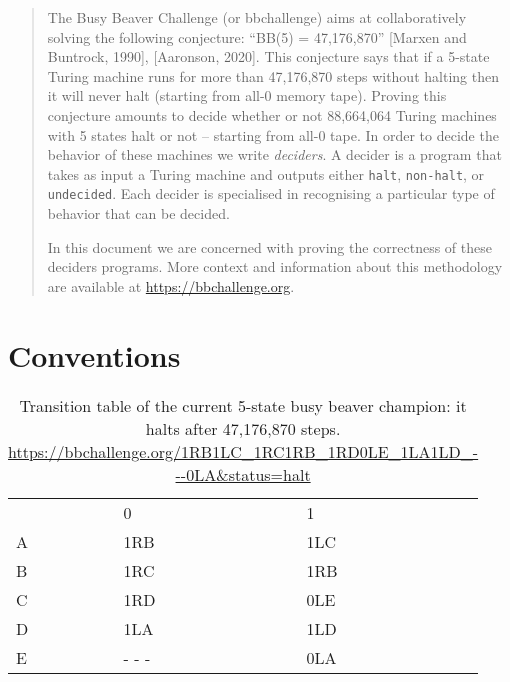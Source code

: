 \documentclass[a4paper,british]{article}
\theoremstyle{definition} %
\numberwithin{equation}{section}
\theoremstyle{definition} %
\begin{document}
\date{}
\maketitle

\begin{abstract}
  The Busy Beaver Challenge (or bbchallenge) aims at collaboratively solving the following conjecture: ``BB(5) = 47,176,870'' [Marxen and Buntrock, 1990]\nocite{Marxen_1990}, [Aaronson, 2020]\nocite{BusyBeaverFrontier}. This conjecture says that if a 5-state Turing machine runs for more than 47,176,870 steps without halting then it will never halt (starting from all-0 memory tape). Proving this conjecture amounts to decide whether or not 88,664,064 Turing machines with 5 states halt or not -- starting from all-0 tape. In order to decide the behavior of these machines we write \textit{deciders}. A decider is a program that takes as input a Turing machine and outputs either \texttt{halt}, \texttt{non-halt}, or \texttt{undecided}. Each decider is specialised in recognising a particular type of behavior that can be decided.

  In this document we are concerned with proving the correctness of these deciders programs. More context and information about this methodology are available at \url{https://bbchallenge.org}.
\end{abstract}

\setcounter{tocdepth}{2}
\tableofcontents

\newpage
\section{Conventions}\label{sec:conventions}

\begin{table}[h!]
  \centering
  \begin{tabular}{lll}
      & 0     & 1   \\
    A & 1RB   & 1LC \\
    B & 1RC   & 1RB \\
    C & 1RD   & 0LE \\
    D & 1LA   & 1LD \\
    E & - - - & 0LA
  \end{tabular}
  \caption{Transition table of the current 5-state busy beaver champion: it halts after 47,176,870 steps.\\\url{https://bbchallenge.org/1RB1LC_1RC1RB_1RD0LE_1LA1LD_---0LA&status=halt}}
\end{table}\label{table:bb5}
\end{document}
